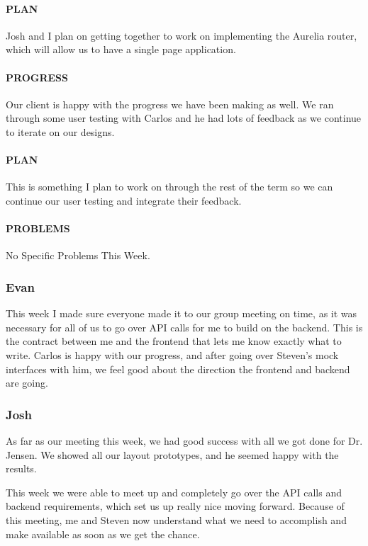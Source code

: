 \documentclass[onecolumn, draftclsnofoot,10pt, compsoc]{IEEEtran}
\begin{document}
	\paragraph{PLAN}
	Josh and I plan on getting together to work on implementing the Aurelia router, which will allow us to have a single page application. 
	
	\paragraph{PROGRESS}
	Our client is happy with the progress we have been making as well. We ran through some user testing with Carlos and he had lots of feedback as we continue to iterate on our designs. 
	
	\paragraph{PLAN}
	This is something I plan to work on through the rest of the term so we can continue our user testing and integrate their feedback.
	
	
	\paragraph{PROBLEMS}
	No Specific Problems This Week.
	
	\subsubsection{Evan}
	This week I made sure everyone made it to our group meeting on time, as it was necessary for all of us to go over API calls for me to build on the backend. This is the contract between me and the frontend that lets me know exactly what to write. Carlos is happy with our progress, and after going over Steven's mock interfaces with him, we feel good about the direction the frontend and backend are going.
	
	\subsubsection{Josh}
	As far as our meeting this week, we had good success with all we got done for Dr. Jensen. We showed all our layout prototypes, and he seemed happy with the results. 
	
	This week we were able to meet up and completely go over the API calls and backend requirements, which set us up really nice moving forward. Because of this meeting, me and Steven now understand what we need to accomplish and make available as soon as we get the chance. 
	
\end{document}
